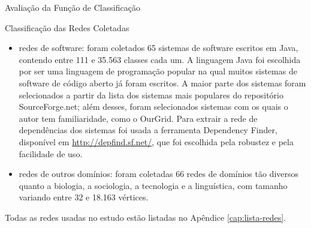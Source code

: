 \begin{section}{Avaliação da Função de Classificação}
\begin{subsection}{Classificação das Redes Coletadas}
\end{subsection}


% 
% 

\begin{itemize}
	\item redes de software: foram coletados 65 sistemas de software escritos em Java, contendo entre 111 e 35.563 classes cada um. A linguagem Java foi escolhida por ser uma linguagem de programação popular na qual muitos sistemas de software de código aberto já foram escritos. A maior parte dos sistemas foram selecionados a partir da lista dos sistemas mais populares do repositório SourceForge.net; além desses, foram selecionados sistemas com os quais o autor tem familiaridade, como o OurGrid. Para extrair a rede de dependências dos sistemas foi usada a ferramenta Dependency Finder, disponível em \url{http://depfind.sf.net/}, que foi escolhida pela robustez e pela facilidade de uso.
	\item redes de outros domínios: foram coletadas 66 redes de domínios tão diversos quanto a biologia, a sociologia, a tecnologia e a linguística, com tamanho variando entre 32 e 18.163 vértices.
\end{itemize}

Todas as redes usadas no estudo estão listadas no Apêndice \ref{cap:lista-redes}.

\end{section}


